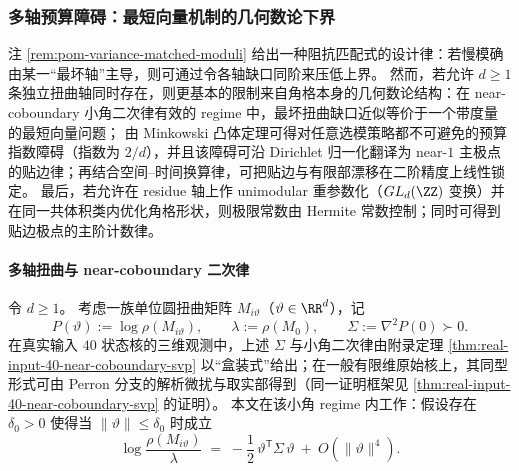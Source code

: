 \subsubsection{多轴预算障碍：最短向量机制的几何数论下界}\label{subsubsec:pom-multi-axis-budget-barrier}
注 \ref{rem:pom-variance-matched-moduli} 给出一种阻抗匹配式的设计律：若慢模确由某一“最坏轴”主导，则可通过令各轴缺口同阶来压低上界。
然而，若允许 \(d\ge 1\) 条独立扭曲轴同时存在，则更基本的限制来自角格本身的几何数论结构：在 near-coboundary 小角二次律有效的 regime 中，最坏扭曲缺口近似等价于一个带度量的最短向量问题；
由 Minkowski 凸体定理可得对任意选模策略都不可避免的预算指数障碍（指数为 \(2/d\)），并且该障碍可沿 Dirichlet 归一化翻译为 near-\(1\) 主极点的贴边律；再结合空间--时间换算律，可把贴边与有限部漂移在二阶精度上线性锁定。
最后，若允许在 residue 轴上作 unimodular 重参数化（\(GL_d(\ZZ)\) 变换）并在同一共体积类内优化角格形状，则极限常数由 Hermite 常数控制；同时可得到贴边极点的主阶计数律。

\paragraph{多轴扭曲与 near-coboundary 二次律}
令 \(d\ge 1\)。
考虑一族单位圆扭曲矩阵 \(M_{i\vartheta}\)（\(\vartheta\in\RR^d\)），记
\[
P(\vartheta):=\log\rho(M_{i\vartheta}),\qquad \lambda:=\rho(M_{0}),\qquad \Sigma:=\nabla^2P(0)\succ 0.
\]
在真实输入 \(40\) 状态核的三维观测中，上述 \(\Sigma\) 与小角二次律由附录定理 \ref{thm:real-input-40-near-coboundary-svp} 以“盒装式”给出；在一般有限维原始核上，其同型形式可由 Perron 分支的解析微扰与取实部得到（同一证明框架见 \ref{thm:real-input-40-near-coboundary-svp} 的证明）。
本文在该小角 regime 内工作：假设存在 \(\delta_0>0\) 使得当 \(\|\vartheta\|\le \delta_0\) 时成立
\begin{equation}\label{eq:pom-multi-axis-near-coboundary}
\log\frac{\rho(M_{i\vartheta})}{\lambda}
\;=\;
-\frac12\,\vartheta^{\mathsf T}\Sigma\,\vartheta\ +\ O(\|\vartheta\|^4).
\end{equation}

